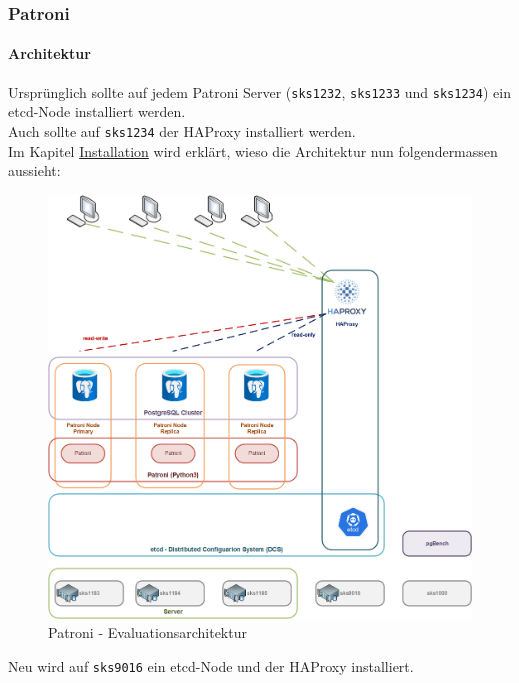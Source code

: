 
\clearpage
{}
\recalctypearea
\begin{flushleft}
    \subsubsection{Patroni}
    \paragraph{Architektur}
    Ursprünglich sollte auf jedem Patroni Server (\texttt{sks1232}, \texttt{sks1233} und \texttt{sks1234}) ein \gls{etcd}-Node installiert werden.\\
    Auch sollte auf \texttt{sks1234} der \Gls{HAProxy} installiert werden.\\
    Im Kapitel \hyperref[par:patroni_installation]{Installation} wird erklärt, wieso die Architektur nun folgendermassen aussieht:
    \begin{figure}[H]
        \centering
        \includegraphics[width=0.8\linewidth]{source/implementation/evaluation/postgresql_ha_solutions/patroni/patroni-evaluation-architecture}
        \caption{Patroni - Evaluationsarchitektur}
        \label{fig:patroni-evaluation-architecture.png}
    \end{figure}
    Neu wird auf \texttt{sks9016} ein \gls{etcd}-Node und der \Gls{HAProxy} installiert.
\end{flushleft}
